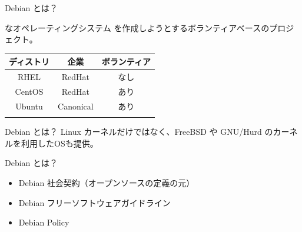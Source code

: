 \begin{frame}{Debian とは？}

{\color{red}{フリー/オープン}}な{\color{red}{ユニバーサル}}オペレーティングシステム を作成しようとするボランティアベースのプロジェクト。

\begin{table}[htb]
  \begin{tabular}{|c|c|c|}
    \hline
    ディストリ & 企業 & ボランティア \\ \hline
    RHEL & RedHat & なし  \\ \hline
    CentOS & RedHat & あり \\ \hline
    Ubuntu  & Canonical & あり \\ \hline
    \color{red}{Debian}  & \color{red}{なし} & \color{red}{あり} \\ \hline
  \end{tabular}
\end{table}

\end{frame}

\begin{frame}{Debian とは？}
Linux カーネルだけではなく、FreeBSD や GNU/Hurd のカーネルを利用したOSも提供。

\begin{center}
\end{center}

\end{frame}

\begin{frame}{Debian とは？}

  \begin{itemize}
  \item Debian 社会契約（オープンソースの定義の元）
  \item Debian フリーソフトウェアガイドライン
  \item Debian Policy
  \end{itemize}

\end{frame}

